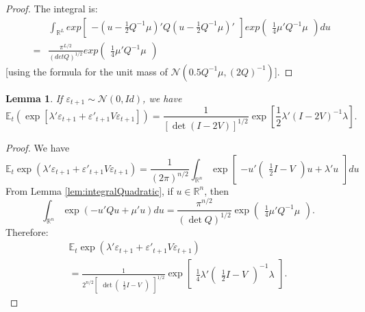 \documentclass[
  12pt,
]{book}
\newtheorem{lemma}{Lemma}[chapter]
\theoremstyle{definition}
\theoremstyle{definition}
\theoremstyle{definition}
\theoremstyle{definition}
\theoremstyle{remark}
\begin{document}
\begin{proof}
The integral is:
\begin{eqnarray*}
&& \int_{\mathbb{R}^{L}} exp \left[ \begin{array}{l} - (u -
\frac{1}{2}  Q^{-1} \mu)'  Q (u -
\frac{1}{2} Q^{-1} \mu)'
\end{array}
\right] exp\left(
\begin{array}{l}  \frac{1}{4} \mu'Q^{-1}\mu \end{array}
\right)du \\
&=&  \frac{\pi^{L/2}}{(det Q)^{1/2}} exp\left(
\begin{array}{l}  \frac{1}{4} \mu'Q^{-1}\mu \end{array}
\right)
\end{eqnarray*}
{[}using the formula for the unit mass of \(\mathcal{N}( 0.5Q^{-1}\mu,(2Q)^{-1})\){]}.
\end{proof}

\begin{lemma}
\protect\hypertarget{lem:Quadr}{}\label{lem:Quadr}If \(\varepsilon_{t+1} \sim \mathcal{N}(0,Id)\), we have
\[
\mathbb{E}_t \left(\exp[\lambda'\varepsilon_{t+1}+\varepsilon'_{t+1} V \varepsilon_{t+1}]\right) =  \frac{1}{[\det(I-2V)]^{1/2}} \exp\left[
\frac{1}{2} \lambda'(I-2V)^{-1}\lambda
\right].
\]
\end{lemma}

\begin{proof}
We have
\[
\mathbb{E}_t   \exp(\lambda'\varepsilon_{t+1}+\varepsilon'_{t+1}V\varepsilon_{t+1})
=  \frac{1}{(2\pi)^{n/2}}  \int_{\mathbb{R}^{n}} \exp\left[
\begin{array}{l}
-u'\left(
\begin{array}{l}
\frac{1}{2} I-V
\end{array}
\right)u+\lambda'u
\end{array}
\right]du
\]
From Lemma \ref{lem:integralQuadratic}, if \(u\in\mathbb{R}^n\), then
\[
\int_{\mathbb{R}^{n}} \exp(-u' Q u+\mu'u) du =
\frac{\pi^{n/2}}{(\det Q)^{1/2}} \exp\left(
\begin{array}{l}
\frac{1}{4} \mu'Q^{-1}\mu
\end{array}
\right).
\]
Therefore:
\[
\begin{array}{l}
\mathbb{E}_t   \exp(\lambda'\varepsilon_{t+1}+\varepsilon'_{t+1}V\varepsilon_{t+1}) \\
=  \frac{1}{2^{n/2}
\left[
\begin{array}{l}
\det \left(
\begin{array}{l}
\frac{1}{2} I-V
\end{array}
\right)
\end{array}
\right]^{1/2}
}
\exp\left[
\begin{array}{l}
\frac{1}{4}  \lambda'\left(
\begin{array}{l}
\frac{1}{2} I-V
\end{array}
\right)^{-1}\lambda
\end{array}
\right].
\end{array}
\]
\end{proof}
\end{document}
